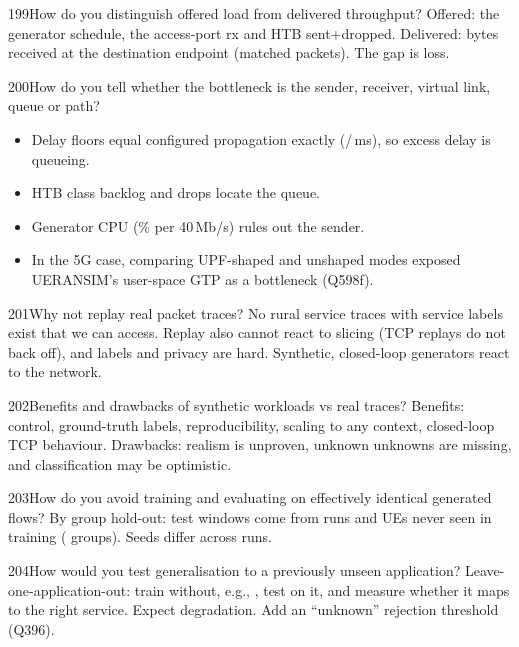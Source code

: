 \begin{qa}{199}{How do you distinguish offered load from delivered throughput?}
Offered: the generator schedule, the access-port rx and HTB sent+dropped. Delivered: bytes received at the
destination endpoint (matched packets). The gap is loss.
\end{qa}

\begin{qa}{200}{How do you tell whether the bottleneck is the sender, receiver, virtual link, queue or path?}
\begin{itemize}
\item Delay floors equal configured propagation exactly (\NFloorEdge/\NFloorCore\,ms), so excess delay is queueing.
\item HTB class backlog and drops locate the queue.
\item Generator CPU (\NGenCpuAfter\% per 40\,Mb/s) rules out the sender.
\item In the 5G case, comparing UPF-shaped and unshaped modes exposed UERANSIM's user-space GTP as a bottleneck
(Q598f).
\end{itemize}
\end{qa}

\begin{qa}{201}{Why not replay real packet traces?}
No rural service traces with service labels exist that we can access. Replay also cannot react to slicing (TCP
replays do not back off), and labels and privacy are hard. Synthetic, closed-loop generators react to the network.
\end{qa}

\begin{qa}{202}{Benefits and drawbacks of synthetic workloads vs real traces?}
Benefits: control, ground-truth labels, reproducibility, scaling to any context, closed-loop TCP behaviour.
Drawbacks: realism is unproven, unknown unknowns are missing, and classification may be optimistic.
\end{qa}

\begin{qa}{203}{How do you avoid training and evaluating on effectively identical generated flows?}
By group hold-out: test windows come from runs and UEs never seen in training (\NSnGroups{} groups). Seeds differ
across runs.
\end{qa}

\begin{qa}{204}{How would you test generalisation to a previously unseen application?}
Leave-one-application-out: train without, e.g., , test on it, and measure whether it
maps to the right service. Expect degradation. Add an ``unknown'' rejection threshold (Q396).
\end{qa}

